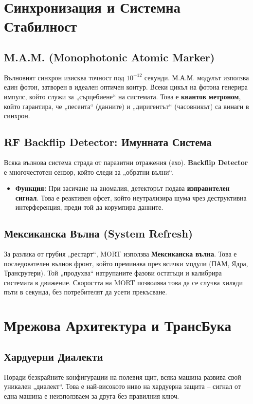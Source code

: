 \documentclass[12pt,a4paper]{article}
\begin{document}
\section{Синхронизация и Системна Стабилност}

\subsection{M.A.M. (Monophotonic Atomic Marker)}
Вълновият синхрон изисква точност под $10^{-12}$ секунди. М.А.М. модулът използва един фотон, затворен в идеален оптичен контур. Всеки цикъл на фотона генерира импулс, който служи за „сърцебиене“ на системата. Това е \textbf{квантов метроном}, който гарантира, че „песента“ (данните) и „диригентът“ (часовникът) са винаги в синхрон.

\subsection{RF Backflip Detector: Имунната Система}
Всяка вълнова система страда от паразитни отражения (ехо). \textbf{Backflip Detector} е многочестотен сензор, който следи за „обратни вълни“. 
\begin{itemize}
    \item \textbf{Функция:} При засичане на аномалия, детекторът подава \textbf{изправителен сигнал}. Това е реактивен офсет, който неутрализира шума чрез деструктивна интерференция, преди той да корумпира данните.
\end{itemize}

\subsection{Мексиканска Вълна (System Refresh)}
За разлика от грубия „рестарт“, MORT използва \textbf{Мексиканска вълна}. Това е последователен вълнов фронт, който преминава през всички модули (ПАМ, Ядра, Трансрутери). Той „продухва“ натрупаните фазови остатъци и калибрира системата в движение. Скоростта на MORT позволява това да се случва хиляди пъти в секунда, без потребителят да усети прекъсване.

\section{Мрежова Архитектура и ТрансБука}

\subsection{Хардуерни Диалекти}
Поради безкрайните конфигурации на полевия щит, всяка машина развива свой уникален „диалект“. Това е най-високото ниво на хардуерна защита – сигнал от една машина е неизползваем за друга без правилния ключ.
\end{document}
